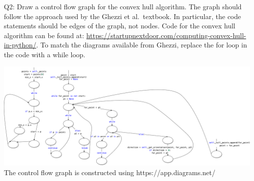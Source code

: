 \documentclass[12pt]{article}
\begin{document}
\noindent Q2: Draw a control flow graph for the convex hull algorithm.  The graph should
  follow the approach used by the Ghezzi et al.\ textbook.  In particular, the
  code statements should be edges of the graph, not nodes.  Code for the convex
  hull algorithm can be found at:
  \href{https://startupnextdoor.com/computing-convex-hull-in-python/}
  {https://startupnextdoor.com/computing-convex-hull-in-python/}.  To match the
  diagrams available from Ghezzi, replace the for loop in the code with a while
  loop.


\begin{center}
  \includegraphics[scale = 0.3]{ConvexHullsemis.png} \\
  The control flow graph is constructed using https://app.diagrams.net/
\end{center}
\end{document}
